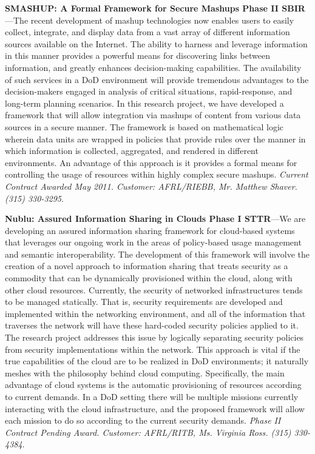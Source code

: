 \documentclass{sbir}
\begin{document}
{\bf SMASHUP: A Formal Framework for Secure Mashups Phase II SBIR}---The recent development of mashup technologies now enables users to easily collect, integrate, and display data from a vast array of different information sources available on the Internet. The ability to harness and leverage information in this manner provides a powerful means for discovering links between information, and greatly enhances decision-making capabilities. The availability of such services in a DoD environment will provide tremendous advantages to the decision-makers engaged in analysis of critical situations, rapid-response, and long-term planning scenarios. In this research project, we have developed a framework that will allow integration via mashups of content from various data sources in a secure manner. The framework is based on mathematical logic wherein data units are wrapped in policies that provide rules over the manner in which information is collected, aggregated, and rendered in different environments. An advantage of this approach is it provides a formal means for controlling the usage of resources within highly complex secure mashups. \emph{Current Contract Awarded May 2011. Customer: AFRL/RIEBB, Mr. Matthew Shaver. (315) 330-3295}.

{\bf Nublu: Assured Information Sharing in Clouds Phase I STTR}---We are developing an assured information sharing framework for cloud-based systems that leverages our ongoing work in the areas of policy-based usage management and semantic interoperability. The development of this framework will involve the creation of a novel approach to information sharing that treats security as a commodity that can be dynamically provisioned within the cloud, along with other cloud resources. Currently, the security of networked infrastructures tends to be managed statically. That is, security requirements are developed and implemented within the networking environment, and all of the information that traverses the network will have these hard-coded security policies applied to it. The research project addresses this issue by logically separating security policies from security implementations within the network. This approach is vital if the true capabilities of the cloud are to be realized in DoD environments; it naturally meshes with the philosophy behind cloud computing. Specifically, the main advantage of cloud systems is the automatic provisioning of resources according to current demands. In a DoD setting there will be multiple missions currently interacting with the cloud infrastructure, and the proposed framework will allow each mission to do so according to the current security demands. \emph{Phase II Contract Pending Award. Customer: AFRL/RITB, Ms. Virginia Ross. (315) 330-4384}.
\end{document}
